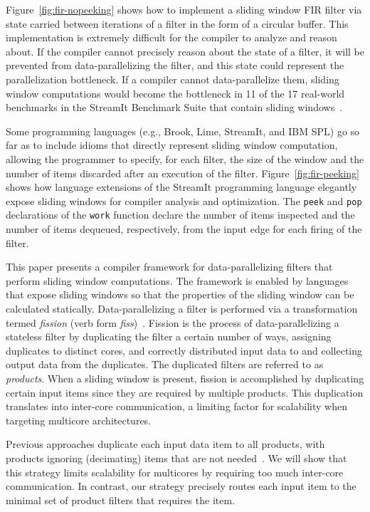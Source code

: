 Figure~\ref{fig:fir-nopeeking} shows how to implement a sliding window
FIR filter via state carried between iterations of a filter in the
form of a circular buffer.  This implementation is extremely difficult
for the compiler to analyze and reason about.  If the compiler cannot
precisely reason about the state of a filter, it will be prevented
from data-parallelizing the filter, and this state could represent the
parallelization bottleneck.  If a compiler cannot data-parallelize them,
sliding window computations would become the bottleneck in 11 of the
17 real-world benchmarks in the StreamIt Benchmark Suite that contain
sliding windows~\cite{streamit-suite}.

 Some programming languages (e.g., Brook, Lime,
StreamIt, and IBM SPL) go so far as to include idioms that directly
represent sliding window computation, allowing the programmer to
specify, for each filter, the size of the window and the number of
items discarded after an execution of the filter.
Figure~\ref{fig:fir-peeking} shows how language extensions of the
StreamIt programming language elegantly expose sliding windows for
compiler analysis and optimization.  The {\tt peek} and {\tt pop}
declarations of the {\tt work} function declare the number of items
inspected and the number of items dequeued, respectively, from the
 input edge for each firing of the filter.

This paper presents a compiler framework for data-parallelizing
filters that perform sliding window computations.  The framework is
enabled by languages that expose sliding windows so that the
properties of the sliding window can be calculated statically.
Data-parallelizing a filter is performed via a transformation termed
{\it fission} (verb form {\it fiss})~\cite{streamit-asplos}.  Fission
is the process of data-parallelizing a stateless filter by duplicating
the filter a certain number of ways, assigning duplicates to distinct
cores, and correctly distributed input data to and collecting output
data from the duplicates.  The duplicated filters are referred to as
{\it products}.  When a sliding window is present, fission is
accomplished by duplicating certain input items since they are
required by multiple products.  This duplication translates into
inter-core communication, a limiting factor for scalability when
targeting multicore architectures.

Previous approaches duplicate each input data item to all products,
with products ignoring (decimating) items that are not
needed~\cite{streamit-asplos}.  We will show that this strategy limits
scalability for multicores by requiring too much inter-core
communication.  In contrast, our strategy precisely routes each input
item to the minimal set of product filters that requires the item.

